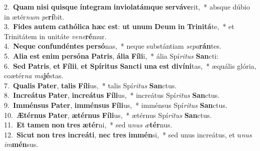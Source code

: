 {2.~}\textbf{Quam} \textbf{ni}\textbf{si} \textbf{quis}\textbf{que} \textbf{ín}\textbf{te}\textbf{gram} \textbf{in}\textbf{vi}\textbf{o}\textbf{la}\textbf{tám}\textbf{que} \textbf{ser}\textbf{vá}\textbf{ve}rit,~* absque dúbio in ætér\textit{num} \textit{pe}\textbf{rí}bit.\\
{3.~}\textbf{Fi}\textbf{des} \textbf{au}\textbf{tem} \textbf{ca}\textbf{thó}\textbf{li}\textbf{ca} \textbf{hæc} \textbf{est}: \textbf{ut} \textbf{u}\textbf{num} \textbf{De}\textbf{um} \textbf{in} \textbf{Tri}\textbf{ni}\textbf{tá}te,~* et Trinitátem in unitáte \textit{ve}\textit{ne}\textbf{ré}mur.\\
{4.~}\textbf{Ne}\textbf{que} \textbf{con}\textbf{fun}\textbf{dén}\textbf{tes} \textbf{per}\textbf{só}nas,~* neque substántiam \textit{se}\textit{pa}\textbf{rán}tes.\\
{5.~}\textbf{A}\textbf{li}\textbf{a} \textbf{est} \textbf{e}\textbf{nim} \textbf{per}\textbf{só}\textbf{na} \textbf{Pa}\textbf{tris}, \textbf{á}\textbf{li}\textbf{a} \textbf{Fí}\textbf{li}i,~* ália Spí\textit{ri}\textit{tus} \textbf{San}cti:\\
{6.~}\textbf{Sed} \textbf{Pa}\textbf{tris}, \textbf{et} \textbf{Fí}\textbf{li}\textbf{i}, \textbf{et} \textbf{Spí}\textbf{ri}\textbf{tus} \textbf{San}\textbf{cti} \textbf{u}\textbf{na} \textbf{est} \textbf{di}\textbf{ví}\textbf{ni}tas,~* æquális glória, coætér\textit{na} \textit{ma}\textbf{jé}stas.\\
{7.~}\textbf{Qua}\textbf{lis} \textbf{Pa}\textbf{ter}, \textbf{ta}\textbf{lis} \textbf{Fí}\textbf{li}us,~* talis Spí\textit{ri}\textit{tus} \textbf{San}ctus.\\
{8.~}\textbf{In}\textbf{cre}\textbf{á}\textbf{tus} \textbf{Pa}\textbf{ter}, \textbf{in}\textbf{cre}\textbf{á}\textbf{tus} \textbf{Fí}\textbf{li}us,~* increátus Spí\textit{ri}\textit{tus} \textbf{San}ctus.\\
{9.~}\textbf{Im}\textbf{mén}\textbf{sus} \textbf{Pa}\textbf{ter}, \textbf{im}\textbf{mén}\textbf{sus} \textbf{Fí}\textbf{li}us,~* imménsus Spí\textit{ri}\textit{tus} \textbf{San}ctus.\\
{10.~}\textbf{Æ}\textbf{tér}\textbf{nus} \textbf{Pa}\textbf{ter}, \textbf{æ}\textbf{tér}\textbf{nus} \textbf{Fí}\textbf{li}us,~* ætérnus Spí\textit{ri}\textit{tus} \textbf{San}ctus.\\
{11.~}\textbf{Et} \textbf{ta}\textbf{men} \textbf{non} \textbf{tres} \textbf{æ}\textbf{tér}ni,~* sed u\textit{nus} \textit{æ}\textbf{tér}nus.\\
{12.~}\textbf{Si}\textbf{cut} \textbf{non} \textbf{tres} \textbf{in}\textbf{cre}\textbf{á}\textbf{ti}, \textbf{nec} \textbf{tres} \textbf{im}\textbf{mén}si,~* sed unus increátus, et u\textit{nus} \textit{im}\textbf{mén}sus.\\
